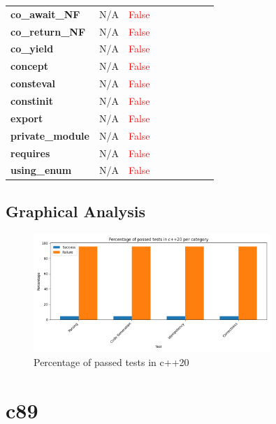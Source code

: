 \documentclass{article}
\begin{document}
\begin{xltabular}{\textwidth}{lcccccccc}
\textbf{{\fontsize{10}{12}\selectfont co\_await\_NF}}& N/A&\textcolor{red}{False} \\[0.5ex]
\textbf{{\fontsize{10}{12}\selectfont co\_return\_NF}}& N/A&\textcolor{red}{False} \\[0.5ex]
\textbf{{\fontsize{10}{12}\selectfont co\_yield}}& N/A&\textcolor{red}{False} \\[0.5ex]
\textbf{{\fontsize{10}{12}\selectfont concept}}& N/A&\textcolor{red}{False} \\[0.5ex]
\textbf{{\fontsize{10}{12}\selectfont consteval}}& N/A&\textcolor{red}{False} \\[0.5ex]
\textbf{{\fontsize{10}{12}\selectfont constinit}}& N/A&\textcolor{red}{False} \\[0.5ex]
\textbf{{\fontsize{10}{12}\selectfont export}}& N/A&\textcolor{red}{False} \\[0.5ex]
\textbf{{\fontsize{10}{12}\selectfont private\_module}}& N/A&\textcolor{red}{False} \\[0.5ex]
\textbf{{\fontsize{10}{12}\selectfont requires}}& N/A&\textcolor{red}{False} \\[0.5ex]
\textbf{{\fontsize{10}{12}\selectfont using\_enum}}& N/A&\textcolor{red}{False} \\[0.5ex]
\bottomrule
\end{xltabular}
\newpage
\subsection{Graphical Analysis}
\begin{figure}[h!]
\centering
\includegraphics[width=0.8\textwidth]{../reports/clava/images/c++20_percentage.png}
\caption{Percentage of passed tests in c++20}
\label{fig:c++20_percentage}
\end{figure}
\newpage
\section{c89}
\end{document}
